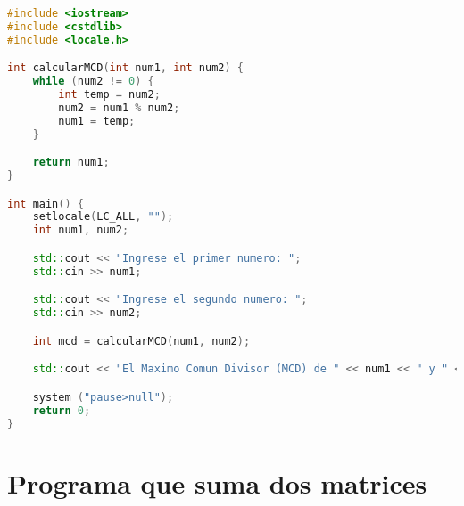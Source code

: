 \noindent
\begin{lstlisting}[language=C++]
#include <iostream>
#include <cstdlib>
#include <locale.h>

int calcularMCD(int num1, int num2) {
    while (num2 != 0) {
        int temp = num2;
        num2 = num1 % num2;
        num1 = temp;
    }

    return num1;
}

int main() {
    setlocale(LC_ALL, "");
    int num1, num2;

    std::cout << "Ingrese el primer numero: ";
    std::cin >> num1;

    std::cout << "Ingrese el segundo numero: ";
    std::cin >> num2;

    int mcd = calcularMCD(num1, num2);

    std::cout << "El Maximo Comun Divisor (MCD) de " << num1 << " y " << num2 << " es: " << mcd << std::endl;

	system ("pause>null");
	return 0;
}

\end{lstlisting}

\section*{Programa que suma dos matrices}

